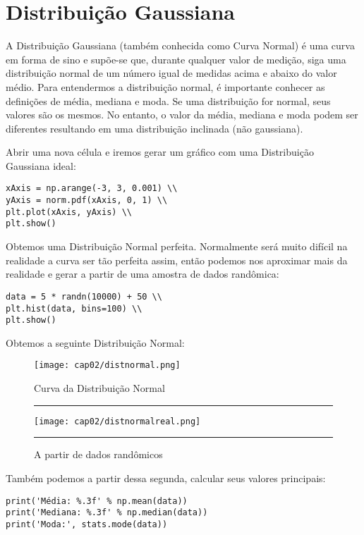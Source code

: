 \section{Distribuição Gaussiana}
A Distribuição Gaussiana (também conhecida como Curva Normal) é uma curva em forma de sino e supõe-se que, durante qualquer valor de medição, siga uma distribuição normal de um número igual de medidas acima e abaixo do valor médio. Para entendermos a distribuição normal, é importante conhecer as definições de média, mediana e moda. Se uma distribuição for normal, seus valores são os mesmos. No entanto, o valor da média, mediana e moda podem ser diferentes resultando em uma distribuição inclinada (não gaussiana).

Abrir uma nova célula e iremos gerar um gráfico com uma Distribuição Gaussiana ideal:
\begin{lstlisting}
xAxis = np.arange(-3, 3, 0.001) \\
yAxis = norm.pdf(xAxis, 0, 1) \\
plt.plot(xAxis, yAxis) \\
plt.show()
\end{lstlisting}

Obtemos uma Distribuição Normal perfeita. Normalmente será muito difícil na realidade a curva ser tão perfeita assim, então podemos nos aproximar mais da realidade e gerar a partir de uma amostra de dados randômica:
\begin{lstlisting}
data = 5 * randn(10000) + 50 \\
plt.hist(data, bins=100) \\
plt.show()
\end{lstlisting}

Obtemos a seguinte Distribuição Normal:
\begin{figure}[H]
	\centering
	\begin{minipage}[t]{0.4\linewidth}
		\texttt{[image: cap02/distnormal.png]}
		\caption{Curva da Distribuição Normal}
		\label{fig:first}
	\end{minipage}\rule{3em}{0pt}%
	\begin{minipage}[t]{0.4\linewidth}
		\texttt{[image: cap02/distnormalreal.png]}
		\caption{A partir de dados randômicos}
		\label{fig:first}
	\end{minipage}\rule{3em}{0pt}%
\end{figure}

Também podemos a partir dessa segunda, calcular seus valores principais:
\begin{lstlisting}
print('Média: %.3f' % np.mean(data))
print('Mediana: %.3f' % np.median(data))
print('Moda:', stats.mode(data))
\end{lstlisting} \vspace{-1em}

